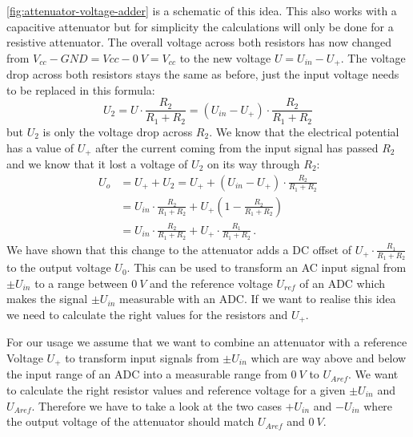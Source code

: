 \cref{fig:attenuator-voltage-adder} is a schematic of this idea. This also works with a capacitive attenuator but for simplicity the calculations will only be done for a resistive attenuator. The overall voltage across both resistors has now changed from $V_{cc} - GND = V{cc} - \SI{0}{V} = V_{cc}$ to the new voltage $U = U_{in} - U_+$. The voltage drop across both resistors stays the same as before, just the input voltage needs to be replaced in this formula:
\begin{equation*}
	U_2 = U \cdot \frac{R_2}{R_1 + R_2} = (U_{in} - U_+) \cdot \frac{R_2}{R_1 + R_2}
\end{equation*}
but $U_2$ is only the voltage drop across $R_2$. We know that the electrical potential has a value of $U_+$ after the current coming from the input signal has passed $R_2$ and we know that it lost a voltage of $U_2$ on its way through $R_2$:
\begin{align*}
	U_o &= U_+ + U_2 = U_+ + (U_{in} - U_+) \cdot \frac{R_2}{R_1 + R_2} \\
		&= U_{in} \cdot \frac{R_2}{R_1 + R_2} + U_+ \left(1 - \frac{R_2}{R_1 + R_2}\right) \\
		&= U_{in} \cdot \frac{R_2}{R_1 + R_2} + U_+ \cdot \frac{R_1}{R_1 + R_2}\,.
\end{align*}
We have shown that this change to the attenuator adds a DC offset of $U_+ \cdot \frac{R_1}{R_1 + R_2}$ to the output voltage $U_0$. This can be used to transform an AC input signal from $\pm U_{in}$ to a range between $\SI{0}{V}$ and the reference voltage $U_{ref}$ of an ADC which makes the signal $\pm U_{in}$ measurable with an ADC. If we want to realise this idea we need to calculate the right values for the resistors and $U_+$.

For our usage we assume that we want to combine an attenuator with a reference Voltage $U_+$ to transform input signals from $\pm{}U_{in}$ which are way above and below the input range of an ADC into a measurable range from $\SI{0}{V}$ to $U_{Aref}$. We want to calculate the right resistor values and reference voltage for a given $\pm{}U_{in}$ and $U_{Aref}$. Therefore we have to take a look at the two cases $+U_{in}$ and $-U_{in}$ where the output voltage of the attenuator should match $U_{Aref}$ and $\SI{0}{V}$.


